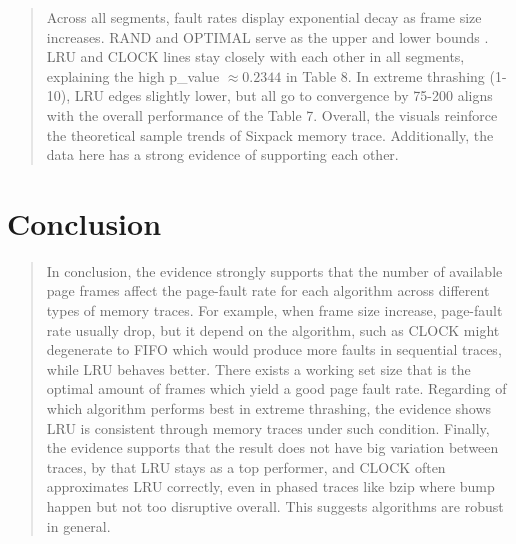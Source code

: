 \documentclass[a4paper, 11pt]{report}
\begin{document}
    \begin{flushright}
        \vspace{0.5cm}
        \begin{minipage}[t]{0.5\linewidth}
            \begin{quote}
                Across all segments, fault rates display exponential decay as frame size increases. RAND and OPTIMAL serve as the upper and lower bounds 
                . LRU and CLOCK lines stay closely with each other in all 
                segments, explaining the high p\_value $\approx 0.2344$ in Table 8. In extreme thrashing (1-10), LRU edges slightly lower, but all go to convergence by 75-200 
                aligns with the overall performance of the Table 7. Overall, the visuals reinforce the theoretical sample trends of Sixpack memory trace.
                Additionally, the data here has a strong evidence of supporting each other.
            \end{quote}
        \end{minipage}
    \end{flushright}
    \begin{figure}[H]
        
    \end{figure}
\newpage
\section*{Conclusion}
    \begin{quote}
        \quad\quad In conclusion, the evidence strongly supports that the number of available page frames affect the page-fault rate for each algorithm across different types of memory traces. For example, when frame size increase, page-fault rate usually drop, but it depend on the algorithm, such as CLOCK might degenerate to FIFO which would produce more faults in sequential traces, while LRU behaves better. There exists a working set size that is the optimal amount of frames which yield a good page fault rate. Regarding of which algorithm performs best in extreme thrashing, the evidence shows LRU is consistent through memory traces under such condition. Finally, the evidence supports that the result does not have big variation between traces, by that LRU stays as a top performer, and CLOCK often approximates LRU correctly, even in phased traces like bzip where bump happen but not too disruptive overall. This suggests algorithms are robust in general. 
    \end{quote}


\end{document}

